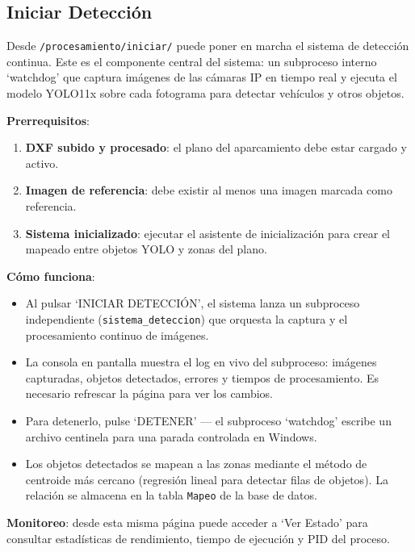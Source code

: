 \documentclass[12pt,a4paper]{article}
\begin{document}
\subsection{Iniciar Detección}

Desde \texttt{/procesamiento/iniciar/} puede poner en marcha el sistema de detección continua. Este es el componente central del sistema: un subproceso interno \lq{}watchdog\rq{} que captura imágenes de las cámaras IP en tiempo real y ejecuta el modelo YOLO11x sobre cada fotograma para detectar vehículos y otros objetos.

\textbf{Prerrequisitos}:

\begin{enumerate}
	\item \textbf{DXF subido y procesado}: el plano del aparcamiento debe estar cargado y activo.
	\item \textbf{Imagen de referencia}: debe existir al menos una imagen marcada como referencia.
	\item \textbf{Sistema inicializado}: ejecutar el asistente de inicialización para crear el mapeado entre objetos YOLO y zonas del plano.
\end{enumerate}

\textbf{Cómo funciona}:

\begin{itemize}
	\item Al pulsar \lq{}INICIAR DETECCIÓN\rq{}, el sistema lanza un subproceso independiente (\texttt{sistema\_deteccion}) que orquesta la captura y el procesamiento continuo de imágenes.
	\item La consola en pantalla muestra el log en vivo del subproceso: imágenes capturadas, objetos detectados, errores y tiempos de procesamiento. Es necesario refrescar la página para ver los cambios.
	\item Para detenerlo, pulse \lq{}DETENER\rq{} --- el subproceso \lq{}watchdog\rq{} escribe un archivo centinela para una parada controlada en Windows.
	\item Los objetos detectados se mapean a las zonas mediante el método de centroide más cercano (regresión lineal para detectar filas de objetos). La relación se almacena en la tabla \texttt{Mapeo} de la base de datos.
\end{itemize}

\textbf{Monitoreo}: desde esta misma página puede acceder a \lq{}Ver Estado\rq{} para consultar estadísticas de rendimiento, tiempo de ejecución y PID del proceso.
\end{document}

